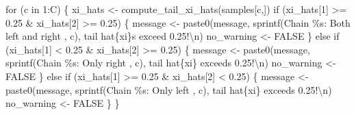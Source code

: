 \documentclass[
  letterpaper,
  DIV=11,
  numbers=noendperiod]{scrartcl}
\newenvironment{Shaded}{\begin{snugshade}}{\end{snugshade}}
\newcommand{\ConstantTok}[1]{\textcolor[rgb]{0.56,0.35,0.01}{#1}}
\newcommand{\ControlFlowTok}[1]{\textcolor[rgb]{0.00,0.23,0.31}{#1}}
\newcommand{\DecValTok}[1]{\textcolor[rgb]{0.68,0.00,0.00}{#1}}
\newcommand{\FloatTok}[1]{\textcolor[rgb]{0.68,0.00,0.00}{#1}}
\newcommand{\FunctionTok}[1]{\textcolor[rgb]{0.28,0.35,0.67}{#1}}
\newcommand{\NormalTok}[1]{\textcolor[rgb]{0.00,0.23,0.31}{#1}}
\newcommand{\OtherTok}[1]{\textcolor[rgb]{0.00,0.23,0.31}{#1}}
\newcommand{\SpecialCharTok}[1]{\textcolor[rgb]{0.37,0.37,0.37}{#1}}
\newcommand{\StringTok}[1]{\textcolor[rgb]{0.13,0.47,0.30}{#1}}
\begin{document}
\begin{Shaded}
\begin{Highlighting}[]
  \ControlFlowTok{for}\NormalTok{ (c }\ControlFlowTok{in} \DecValTok{1}\SpecialCharTok{:}\NormalTok{C) \{}
\NormalTok{    xi\_hats }\OtherTok{\textless{}{-}} \FunctionTok{compute\_tail\_xi\_hats}\NormalTok{(samples[c,])}
    \ControlFlowTok{if}\NormalTok{ (xi\_hats[}\DecValTok{1}\NormalTok{] }\SpecialCharTok{\textgreater{}=} \FloatTok{0.25} \SpecialCharTok{\&}\NormalTok{ xi\_hats[}\DecValTok{2}\NormalTok{] }\SpecialCharTok{\textgreater{}=} \FloatTok{0.25}\NormalTok{) \{}
\NormalTok{      message }\OtherTok{\textless{}{-}} \FunctionTok{paste0}\NormalTok{(message,}
                        \FunctionTok{sprintf}\NormalTok{(}\StringTok{\textquotesingle{}Chain \%s: Both left and right \textquotesingle{}}\NormalTok{, c),}
                        \StringTok{\textquotesingle{}tail hat\{xi\}s exceed 0.25!}\SpecialCharTok{\textbackslash{}n}\StringTok{\textquotesingle{}}\NormalTok{)}
\NormalTok{      no\_warning }\OtherTok{\textless{}{-}} \ConstantTok{FALSE}
\NormalTok{    \} }\ControlFlowTok{else} \ControlFlowTok{if}\NormalTok{ (xi\_hats[}\DecValTok{1}\NormalTok{] }\SpecialCharTok{\textless{}} \FloatTok{0.25} \SpecialCharTok{\&}\NormalTok{ xi\_hats[}\DecValTok{2}\NormalTok{] }\SpecialCharTok{\textgreater{}=} \FloatTok{0.25}\NormalTok{) \{}
\NormalTok{      message }\OtherTok{\textless{}{-}} \FunctionTok{paste0}\NormalTok{(message,}
                        \FunctionTok{sprintf}\NormalTok{(}\StringTok{\textquotesingle{}Chain \%s: Only right \textquotesingle{}}\NormalTok{, c),}
                        \StringTok{\textquotesingle{}tail hat\{xi\} exceeds 0.25!}\SpecialCharTok{\textbackslash{}n}\StringTok{\textquotesingle{}}\NormalTok{)}
\NormalTok{      no\_warning }\OtherTok{\textless{}{-}} \ConstantTok{FALSE}
\NormalTok{    \} }\ControlFlowTok{else} \ControlFlowTok{if}\NormalTok{ (xi\_hats[}\DecValTok{1}\NormalTok{] }\SpecialCharTok{\textgreater{}=} \FloatTok{0.25} \SpecialCharTok{\&}\NormalTok{ xi\_hats[}\DecValTok{2}\NormalTok{] }\SpecialCharTok{\textless{}} \FloatTok{0.25}\NormalTok{) \{}
\NormalTok{      message }\OtherTok{\textless{}{-}} \FunctionTok{paste0}\NormalTok{(message,}
                        \FunctionTok{sprintf}\NormalTok{(}\StringTok{\textquotesingle{}Chain \%s: Only left \textquotesingle{}}\NormalTok{, c),}
                        \StringTok{\textquotesingle{}tail hat\{xi\} exceeds 0.25!}\SpecialCharTok{\textbackslash{}n}\StringTok{\textquotesingle{}}\NormalTok{)}
\NormalTok{      no\_warning }\OtherTok{\textless{}{-}} \ConstantTok{FALSE}
\NormalTok{    \}}
\NormalTok{  \}}
  

\end{Highlighting}
\end{Shaded}
\end{document}
